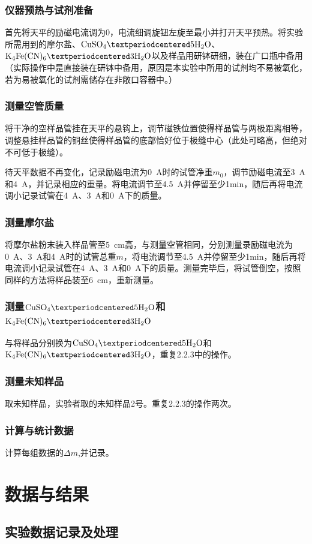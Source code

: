 \documentclass[12pt]{article}
\begin{document}
			\subsubsection{仪器预热与试剂准备}
				首先将天平的励磁电流调为0，电流细调旋钮左旋至最小并打开天平预热。将实验所需用到的摩尔盐、$\rm{CuSO_{4}·5H_{2}O}$、$\rm{K_{4}Fe(CN)_{6}·3H_{2}O}$以及样品用研钵研细，装在广口瓶中备用（实际操作中是直接装在研钵中备用，原因是本实验中所用的试剂均不易被氧化，若为易被氧化的试剂需储存在非敞口容器中。）
			\subsubsection{测量空管质量}
				将干净的空样品管挂在天平的悬钩上，调节磁铁位置使得样品管与两极距离相等，调整悬挂样品管的铜丝使得样品管的底部恰好位于极缝中心（此处可略高，但绝对不可低于极缝）。\par
				待天平数据不再变化，记录励磁电流为0\ A时的试管净重$m_{0}$，调节励磁电流至3\ A和4\ A，并记录相应的重量。将电流调节至4.5\ A并停留至少1min，随后再将电流调小记录试管在4\ A、3\ A和0\ A下的质量。
			\subsubsection{测量摩尔盐}
				将摩尔盐粉末装入样品管至5\ cm高，与测量空管相同，分别测量录励磁电流为0\ A、3\ A和4\ A时的试管总重$m$，将电流调节至4.5\ A并停留至少1min，随后再将电流调小记录试管在4\ A、3\ A和0\ A下的质量。测量完毕后，将试管倒空，按照同样的方法将样品装至6\ cm，重新测量。
			\subsubsection{测量$\rm{CuSO_{4}·5H_{2}O}$和$\rm{K_{4}Fe(CN)_{6}·3H_{2}O}$}
				与将样品分别换为$\rm{CuSO_{4}·5H_{2}O}$和$\rm{K_{4}Fe(CN)_{6}·3H_{2}O}$，重复2.2.3中的操作。
			\subsubsection{测量未知样品}
				取未知样品，实验者取的未知样品2号。重复2.2.3的操作两次。
			\subsubsection{计算与统计数据}
				计算每组数据的$\Delta m$,并记录。
    	
	
	 \section{数据与结果}
 		\subsection{实验数据记录及处理}
\end{document}
